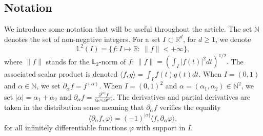 \documentclass[aos]{imsart}
\theoremstyle{plain}
\theoremstyle{remark}
\newcommand{\R}{\mathbb{R}}
\newcommand{\1}{1}
\begin{document}
\subsection*{Notation} 

We introduce some notation that will be useful throughout the article. The set $\mathbb N$ denotes the set of non-negative integers. For a set $I\subset\R^d$, for $d\geq 1$, we denote 
$$\mathbb L^2(I)=\Big\{ f:I\longmapsto\mathbb R:\ \|f\|<+\infty\Big\},$$
where $\|f\|$ stands for the $\mathbb L_2$-norm of $f$: $\|f\| = \left(\int_I |f(t)|^2dt\right)^{1/2}.$ The associated scalar product is denoted $\langle f,g\rangle = \int_I f(t)g(t)dt$. When $I=(0,1)$ and $\alpha\in\mathbb N$, we set $\partial_\alpha f = f^{(\alpha)}$. When $I=(0,1)^2$ and $\alpha=(\alpha_1,\alpha_2)\in\mathbb N^2$, we set $|\alpha|=\alpha_1+\alpha_2$ and $\partial_\alpha f = \frac{\partial^{|\alpha|} f}{\partial s^{\alpha_1}\partial t^{\alpha_2}}$.
 The derivatives and partial derivatives are taken in the distribution sense meaning that $\partial_{\alpha}f$ verifies the equality
	\[
	\langle \partial_\alpha f,\varphi\rangle  = (-1)^{|\alpha|}\langle f,\partial_{\alpha}\varphi\rangle, 
\] 
for all infinitely differentiable functions $\varphi$ with support in $I$.
\end{document}
